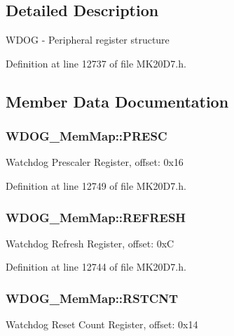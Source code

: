\subsection{Detailed Description}
W\+D\+OG -\/ Peripheral register structure 

Definition at line 12737 of file M\+K20\+D7.\+h.



\subsection{Member Data Documentation}
\subsubsection[{\texorpdfstring{P\+R\+E\+SC}{PRESC}}]{ W\+D\+O\+G\+\_\+\+Mem\+Map\+::\+P\+R\+E\+SC}\hypertarget{struct_w_d_o_g___mem_map_a8d00541f19094160ea06d8c7ded60298}{}\label{struct_w_d_o_g___mem_map_a8d00541f19094160ea06d8c7ded60298}
Watchdog Prescaler Register, offset\+: 0x16 

Definition at line 12749 of file M\+K20\+D7.\+h.

\subsubsection[{\texorpdfstring{R\+E\+F\+R\+E\+SH}{REFRESH}}]{ W\+D\+O\+G\+\_\+\+Mem\+Map\+::\+R\+E\+F\+R\+E\+SH}\hypertarget{struct_w_d_o_g___mem_map_a5dbb3963b38571b0de1d2db7bd89d46a}{}\label{struct_w_d_o_g___mem_map_a5dbb3963b38571b0de1d2db7bd89d46a}
Watchdog Refresh Register, offset\+: 0xC 

Definition at line 12744 of file M\+K20\+D7.\+h.

\subsubsection[{\texorpdfstring{R\+S\+T\+C\+NT}{RSTCNT}}]{ W\+D\+O\+G\+\_\+\+Mem\+Map\+::\+R\+S\+T\+C\+NT}\hypertarget{struct_w_d_o_g___mem_map_aad95a949933f4c578786a38a2ffeec4a}{}\label{struct_w_d_o_g___mem_map_aad95a949933f4c578786a38a2ffeec4a}
Watchdog Reset Count Register, offset\+: 0x14 

